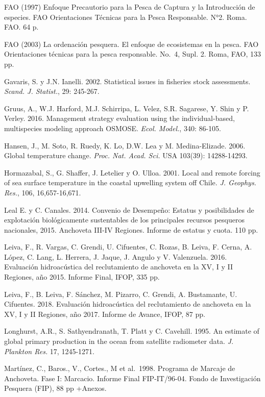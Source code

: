 \documentclass[letter,11pt]{article}
\begin{document}
FAO (1997) Enfoque Precautorio para la Pesca de Captura y la
Introducci\'on de especies. FAO Orientaciones T\'ecnicas para la Pesca
Responsable. N°2. Roma. FAO. 64 p.

FAO (2003) La ordenaci\'on pesquera. El enfoque de ecosistemas en la
pesca. FAO Orientaciones t\'ecnicas para la pesca responsable. No.~4,
Supl. 2. Roma, FAO, 133 pp.~

Gavaris, S. y J.N. Ianelli. 2002. Statistical issues in fisheries stock
assessments. \textit{Scand. J. Statist.}, 29: 245-267.

Gruus, A., W.J. Harford, M.J. Schirripa, L. Velez, S.R. Sagarese, Y.
Shin y P. Verley. 2016. Management strategy evaluation using the
individual-based, multispecies modeling approach OSMOSE.
\textit{Ecol. Model.}, 340: 86-105.

Hansen, J., M. Soto, R. Ruedy, K. Lo, D.W. Lea y M. Medina-Elizade.
2006. Global temperature change. \textit{Proc. Nat. Acad. Sci.} USA
103(39): 14288-14293.

Hormazabal, S., G. Shaffer, J. Letelier y O. Ulloa. 2001. Local and
remote forcing of sea surface temperature in the coastal upwelling
system off Chile. \textit{J. Geophys. Res.}, 106, 16,657-16,671.

Leal E. y C. Canales. 2014. Convenio de Desempe\~{n}o: Estatus y
posibilidades de explotaci\'on biol\'ogicamente sustentables de los
principales recursos pesqueros nacionales, 2015. Anchoveta III-IV
Regiones. Informe de estatus y cuota. 110 pp.

Leiva, F., R. Vargas, C. Grendi, U. Cifuentes, C. Rozas, B. Leiva, F.
Cerna, A. L\'opez, C. Lang, L. Herrera, J. Jaque, J. Angulo y V.
Valenzuela. 2016. Evaluaci\'on hidroac\'ustica del reclutamiento de
anchoveta en la XV, I y II Regiones, a\~{n}o 2015. Informe Final, IFOP, 335
pp.

Leiva, F., B. Leiva, F. S\'anchez, M. Pizarro, C. Grendi, A. Bustamante,
U. Cifuentes. 2018. Evaluaci\'on hidroac\'ustica del reclutamiento de
anchoveta en la XV, I y II Regiones, a\~{n}o 2017. Informe de Avance, IFOP,
87 pp.

Longhurst, A.R., S. Sathyendranath, T. Platt y C. Cavehill. 1995. An
estimate of global primary production in the ocean from satellite
radiometer data. \textit{J. Plankton Res.} 17, 1245-1271.

Mart\'inez, C., Baros., V., Cortes., M et al.~1998. Programa de Marcaje de
Anchoveta. Fase I: Marcacio. Informe Final FIP-IT/96-04. Fondo de
Investigaci\'on Pesquera (FIP), 88 pp +Anexos.
\end{document}
